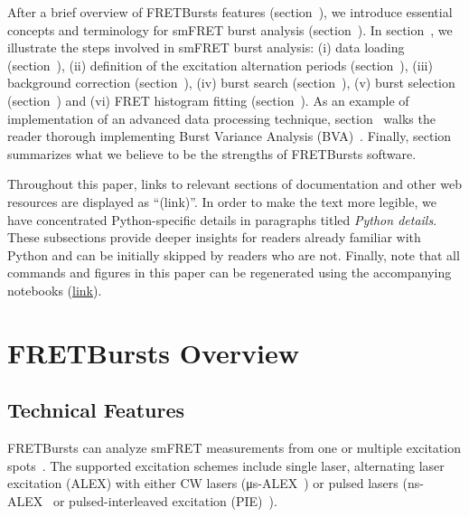 \documentclass[10pt,letterpaper]{article}
\begin{document}
After a brief overview of FRETBursts features (section~),
we introduce essential concepts and terminology for smFRET burst analysis
(section~).
In section~, we illustrate the steps involved
in smFRET burst analysis: (i) data loading (section~),
(ii) definition of the excitation alternation periods
(section~), (iii) background correction
(section~), (iv) burst search
(section~),
(v) burst selection (section~) and
(vi) FRET histogram fitting (section~).
As an example
of implementation of an advanced data processing technique,
section~ walks the reader thorough implementing
Burst Variance Analysis (BVA)~\cite{Torella_2011}.
Finally, section~ summarizes what we believe
to be the strengths of FRETBursts software.

Throughout this paper,
links to relevant sections of documentation and other web resources
are displayed as ``(link)''.
In order to make the text more legible,
we have concentrated Python-specific details in paragraphs titled
\textit{Python details}. These subsections provide deeper insights for readers
already familiar with Python and can be initially skipped by readers who are not.
Finally, note that all commands and figures in this paper can be regenerated
using the accompanying notebooks
(\href{https://github.com/tritemio/fretbursts_paper}{link}).


\section*{FRETBursts Overview}
\label{sec:overview}

\subsection*{Technical Features}

FRETBursts can analyze smFRET measurements
from one or multiple excitation spots~\cite{Ingargiola_2013}. The supported
excitation schemes include single laser, alternating laser excitation (ALEX)
with either CW lasers (μs-ALEX~\cite{Kapanidis_2005})
or pulsed lasers (ns-ALEX~\cite{Laurence_2005} or
pulsed-interleaved excitation (PIE)~\cite{M_ller_2005}).
\end{document}
